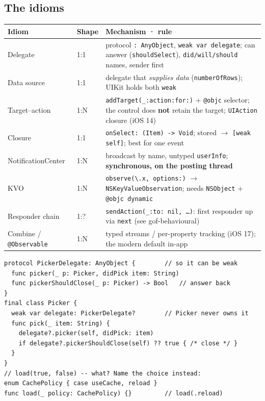 \documentclass[8pt]{extarticle}
\begin{document}
\begin{multicols}{2}
\raggedright

\section{The idioms}
{\footnotesize\setlength\tabcolsep{3pt}
\begin{tabular}{@{}L{15mm}L{7mm}L{55mm}@{}}
\toprule
\textbf{Idiom} & \textbf{Shape} & \textbf{Mechanism · rule} \\
\midrule
Delegate & 1:1 & protocol \texttt{: AnyObject}, \texttt{weak var delegate}; can answer
(\texttt{shouldSelect}), \texttt{did/will/should} names, sender first \\
Data source & 1:1 & delegate that \emph{supplies data} (\texttt{numberOfRows}); UIKit holds
both \texttt{weak} \\
Target–action & 1:N & \texttt{addTarget(\_:action:for:)} + \texttt{@objc} selector; the control
does \textbf{not} retain the target; \texttt{UIAction} closure (iOS 14) \\
Closure & 1:1 & \texttt{onSelect: (Item) -> Void}; stored $\to$ \texttt{[weak self]}; best
for one event \\
Notification\-Center & 1:N & broadcast by name, untyped \texttt{userInfo};
\textbf{synchronous, on the posting thread} \\
KVO & 1:N & \texttt{observe(\textbackslash.x, options:)} $\to$
\texttt{NSKeyValueObservation}; needs \texttt{NSObject} + \texttt{@objc dynamic} \\
Responder chain & 1:? & \texttt{sendAction(\_:to: nil, …)}: first responder up via
\texttt{next} (see gof-behavioural) \\
Combine / \texttt{@Observable} & 1:N & typed streams / per-property tracking (iOS 17);
the modern default in-app \\
\bottomrule
\end{tabular}}

\begin{lstlisting}[language=SwiftSheet]
protocol PickerDelegate: AnyObject {        // so it can be weak
  func picker(_ p: Picker, didPick item: String)
  func pickerShouldClose(_ p: Picker) -> Bool   // answer back
}
final class Picker {
  weak var delegate: PickerDelegate?        // Picker never owns it
  func pick(_ item: String) {
    delegate?.picker(self, didPick: item)
    if delegate?.pickerShouldClose(self) ?? true { /* close */ }
  }
}
// load(true, false) -- what? Name the choice instead:
enum CachePolicy { case useCache, reload }
func load(_ policy: CachePolicy) {}         // load(.reload)
\end{lstlisting}


\end{multicols}
\end{document}
